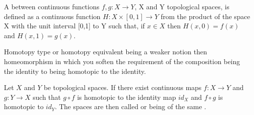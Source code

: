 \documentclass[../../main.tex]{subfiles}
\begin{document}
    \begin{definition}
        A  between continuous functions $f,g: X\to Y$, X and Y topological spaces, is defined as a continuous function  $H : X \times [0,1] \to Y$ from the product of the space X with the unit interval [0,1] to Y such that, if $x \in X$ then $H(x,0) = f(x)$ and $H(x,1) = g(x)$.
    \end{definition}

    Homotopy type or homotopy equivalent being a weaker notion then homeomorphism in which you soften the requirement of the composition being the identity to being homotopic to the identity. 

    \begin{definition}
        Let $X$ and $Y$ be topological spaces. If there exist continuous maps $f : X \to Y$ and $g : Y \to X$ such that $g \circ f$ is homotopic to the identity map $id_X$ and $f \circ g$ is homotopic to $id_Y$. The spaces are then called  or being of the same .
    \end{definition}
\end{document}
